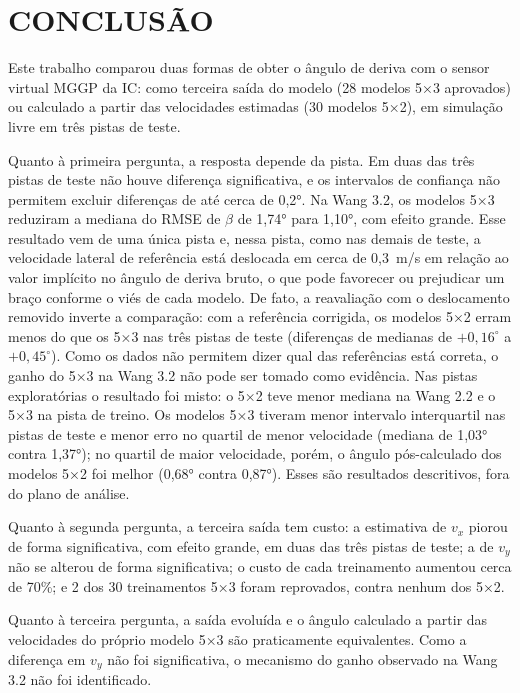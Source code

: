 \chapter{CONCLUSÃO}\label{sec:conclusao}

Este trabalho comparou duas formas de obter o ângulo de deriva com o sensor virtual MGGP da IC: como terceira saída do modelo (28 modelos 5×3 aprovados) ou calculado a partir das velocidades estimadas (30 modelos 5×2), em simulação livre em três pistas de teste.

Quanto à primeira pergunta, a resposta depende da pista. Em duas das três pistas de teste não houve diferença significativa, e os intervalos de confiança não permitem excluir diferenças de até cerca de 0,2°. Na Wang 3.2, os modelos 5×3 reduziram a mediana do RMSE de $\beta$ de 1,74° para 1,10°, com efeito grande. Esse resultado vem de uma única pista e, nessa pista, como nas demais de teste, a velocidade lateral de referência está deslocada em cerca de 0,3~m/s em relação ao valor implícito no ângulo de deriva bruto, o que pode favorecer ou prejudicar um braço conforme o viés de cada modelo. De fato, a reavaliação com o deslocamento removido inverte a comparação: com a referência corrigida, os modelos 5×2 erram menos do que os 5×3 nas três pistas de teste (diferenças de medianas de $+0{,}16^\circ$ a $+0{,}45^\circ$). Como os dados não permitem dizer qual das referências está correta, o ganho do 5×3 na Wang 3.2 não pode ser tomado como evidência. Nas pistas exploratórias o resultado foi misto: o 5×2 teve menor mediana na Wang 2.2 e o 5×3 na pista de treino. Os modelos 5×3 tiveram menor intervalo interquartil nas pistas de teste e menor erro no quartil de menor velocidade (mediana de 1,03° contra 1,37°); no quartil de maior velocidade, porém, o ângulo pós-calculado dos modelos 5×2 foi melhor (0,68° contra 0,87°). Esses são resultados descritivos, fora do plano de análise.

Quanto à segunda pergunta, a terceira saída tem custo: a estimativa de $v_x$ piorou de forma significativa, com efeito grande, em duas das três pistas de teste; a de $v_y$ não se alterou de forma significativa; o custo de cada treinamento aumentou cerca de 70\%; e 2 dos 30 treinamentos 5×3 foram reprovados, contra nenhum dos 5×2.

Quanto à terceira pergunta, a saída evoluída e o ângulo calculado a partir das velocidades do próprio modelo 5×3 são praticamente equivalentes. Como a diferença em $v_y$ não foi significativa, o mecanismo do ganho observado na Wang 3.2 não foi identificado.

